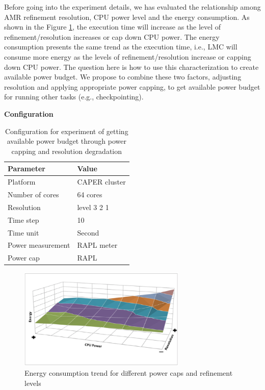 \label{Section:approach}
Before going into the experiment details, we has evaluated the relationship among AMR refinement resolution, CPU power level and the energy consumption. As shown in the Figure \ref{fig:Energy_consumption_trend}, the execution time will increase as the level of refinement/resolution increases or cap down CPU power. The energy consumption presents the same trend as the execution time, i.e., LMC will consume more energy as the levels of refinement/resolution increase or capping down CPU power. The question here is how to use this characterization to create available power budget. We propose to combine these two factors, adjusting resolution and applying appropriate power capping, to get available power budget for running other tasks (e.g., checkpointing). 


\textbf{Configuration}
\begin{table}[H]
\begin{center}
\begin{tabular}{|l|l|}
	\hline
	\textbf{Parameter} & \textbf{Value}\\ \hline
    Platform & CAPER cluster\\ 		\hline
    Number of cores & 64 cores\\
	\hline
	Resolution & level 3 2 1\\
    \hline
    Time step & 10\\
    \hline
    Time unit & Second\\
    \hline
    Power measurement & RAPL meter\\
    \hline
    Power cap & RAPL\\
    \hline
\end{tabular}
\end{center}
\caption{Configuration for experiment of getting available power budget through power capping and resolution degradation
}
\label{table:table_tradeoff}
\end{table}



\begin{figure}[H]
	\centering
    \includegraphics[width=8cm]{figs/Energy_consumption_trend.png}
        \caption{Energy consumption trend for different power caps and refinement levels}
        \label{fig:Energy_consumption_trend}
\end{figure}

